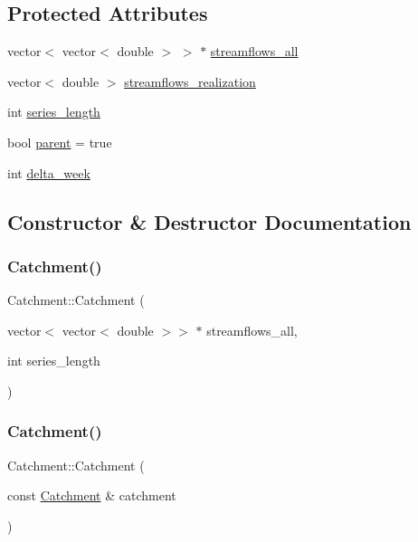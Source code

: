 \subsection*{Protected Attributes}
\begin{DoxyCompactItemize}
\item 
vector$<$ vector$<$ double $>$ $>$ $\ast$ \mbox{\hyperlink{classCatchment_a579ccda86831f286c19c76354e7125c3}{streamflows\+\_\+all}}
\item 
vector$<$ double $>$ \mbox{\hyperlink{classCatchment_aaf04c295ecd6b666fa1439d3d5bc072a}{streamflows\+\_\+realization}}
\item 
int \mbox{\hyperlink{classCatchment_a2d4994220f63b876348b4ce4892bc6d3}{series\+\_\+length}}
\item 
bool \mbox{\hyperlink{classCatchment_a472ff6892f90d94b8c4dba53c462dedf}{parent}} = true
\item 
int \mbox{\hyperlink{classCatchment_a20548a9d03f0d39f297cb15b3c0433ad}{delta\+\_\+week}}
\end{DoxyCompactItemize}


\subsection{Constructor \& Destructor Documentation}
\mbox{\label{classCatchment_aafdee6ee868a8892314672abb119e60f}} 
\subsubsection{\texorpdfstring{Catchment()}{Catchment()}\hspace{0.1cm}{\footnotesize\ttfamily [1/2]}}
{\footnotesize\ttfamily Catchment\+::\+Catchment (\begin{DoxyParamCaption}\item[{vector$<$ vector$<$ double $>$$>$ $\ast$}]{streamflows\+\_\+all,  }\item[{int}]{series\+\_\+length }\end{DoxyParamCaption})}

\mbox{\label{classCatchment_ae311c4b2d857a8b5abc01f5317b04df2}} 
\subsubsection{\texorpdfstring{Catchment()}{Catchment()}\hspace{0.1cm}{\footnotesize\ttfamily [2/2]}}
{\footnotesize\ttfamily Catchment\+::\+Catchment (\begin{DoxyParamCaption}\item[{const \mbox{\hyperlink{classCatchment}{Catchment}} \&}]{catchment }\end{DoxyParamCaption})}


